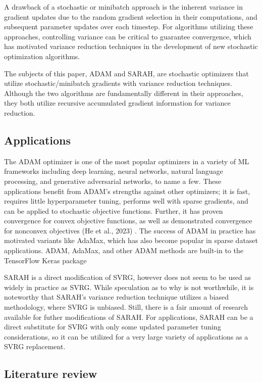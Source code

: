 \documentclass[letterpaper,11 pt]{article}
\begin{document}
A drawback of a stochastic or minibatch approach is the inherent variance in gradient updates due to the random gradient selection in their computations, and subsequent parameter updates over each timestep.  For algorithms utilizing these approaches, controlling variance can be critical to guarantee convergence, which has motivated variance reduction techniques in the development of new stochastic optimization algorithms.

The subjects of this paper, ADAM and SARAH, are stochastic optimizers that utilize stochastic/minibatch gradients with variance reduction techniques.  Although the two algorithms are fundamentally different in their approaches, they both utilize recursive accumulated gradient information for variance reduction.  


\subsection{Applications} 
The ADAM optimizer is one of the most popular optimizers in a variety of ML frameworks including deep learning, neural networks, natural language processing, and generative adversarial networks, to name a few.  These applications benefit from ADAM’s strengths against other optimizers; it is fast, requires little hyperparameter tuning, performs well with sparse gradients, and can be applied to stochastic objective functions.  Further, it has proven convergence for convex objective functions, as well as demonstrated convergence for nonconvex objectives (He et al., 2023) \cite{heconvergence}.  The success of ADAM in practice has motivated variants like AdaMax, which has also become popular in sparse dataset applications.  ADAM, AdaMax, and other ADAM methods are built-in to the TensorFlow Keras package \cite{tensorflow}

SARAH is a direct modification of SVRG, however does not seem to be used as widely in practice as SVRG.  While speculation as to why is not worthwhile, it is noteworthy that SARAH’s variance reduction technique utilizes a biased methodology, where SVRG is unbiased.  Still, there is a fair amount of research available for futher modifications of SARAH.  For applications, SARAH can be a direct substitute for SVRG with only some updated parameter tuning considerations, so it can be utilized for a very large variety of applications as a SVRG replacement.

\subsection{ Literature review}
\end{document}
